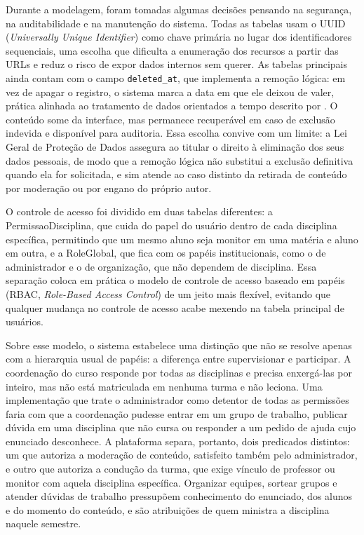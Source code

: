 Durante a modelagem, foram tomadas algumas decisões pensando na segurança, na
auditabilidade e na manutenção do sistema. Todas as tabelas usam o UUID
(\textit{Universally Unique Identifier}) \citep{leach2005} como chave primária no
lugar dos identificadores sequenciais, uma escolha que dificulta a enumeração
dos recursos a partir das URLs e reduz o risco de expor dados internos sem
querer. As tabelas principais ainda contam com o campo \texttt{deleted\_at}, que
implementa a remoção lógica: em vez de apagar o registro, o sistema marca a data
em que ele deixou de valer, prática alinhada ao tratamento de dados orientados a
tempo descrito por \cite{snodgrass1999}. O conteúdo some da interface, mas
permanece recuperável em caso de exclusão indevida e disponível para auditoria.
Essa escolha convive com um limite: a Lei Geral de Proteção de Dados
\citep{brasil2018} assegura ao titular o direito à eliminação dos seus dados
pessoais, de modo que a remoção lógica não substitui a exclusão definitiva
quando ela for solicitada, e sim atende ao caso distinto da retirada de conteúdo
por moderação ou por engano do próprio autor.

O controle de acesso foi dividido em duas tabelas diferentes: a
PermissaoDisciplina, que cuida do papel do usuário dentro de cada disciplina
específica, permitindo que um mesmo aluno seja monitor em uma matéria e aluno em
outra, e a RoleGlobal, que fica com os papéis institucionais, como o de
administrador e o de organização, que não dependem de disciplina. Essa separação
coloca em prática o modelo de controle de acesso baseado em papéis (RBAC,
\textit{Role-Based Access Control}) \citep{sandhu1996} de um jeito mais
flexível, evitando que qualquer mudança no controle de acesso acabe mexendo na
tabela principal de usuários.

Sobre esse modelo, o sistema estabelece uma distinção que não se resolve apenas
com a hierarquia usual de papéis: a diferença entre supervisionar e participar.
A coordenação do curso responde por todas as disciplinas e precisa enxergá-las
por inteiro, mas não está matriculada em nenhuma turma e não leciona. Uma
implementação que trate o administrador como detentor de todas as permissões
faria com que a coordenação pudesse entrar em um grupo de trabalho, publicar
dúvida em uma disciplina que não cursa ou responder a um pedido de ajuda cujo
enunciado desconhece. A plataforma separa, portanto, dois predicados distintos:
um que autoriza a moderação de conteúdo, satisfeito também pelo administrador,
e outro que autoriza a condução da turma, que exige vínculo de professor ou
monitor com aquela disciplina específica. Organizar equipes, sortear grupos e
atender dúvidas de trabalho pressupõem conhecimento do enunciado, dos alunos e
do momento do conteúdo, e são atribuições de quem ministra a disciplina naquele
semestre.

